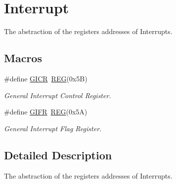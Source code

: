 \hypertarget{group__INTERRUPTMCAL}{\section{Interrupt}
\label{group__INTERRUPTMCAL}
}


The abstraction of the registers addresses of Interrupts.  


\subsection*{Macros}
\begin{DoxyCompactItemize}
\item 
\hypertarget{group__INTERRUPTMCAL_ga3e35f0f5ebfa96f116683e03fdd2d28e}{\#define \hyperlink{group__INTERRUPTMCAL_ga3e35f0f5ebfa96f116683e03fdd2d28e}{G\+I\+C\+R}~\hyperlink{group__MCAL_ga72e45020e46f285689db51c46f273403}{R\+E\+G}(0x5\+B)}\label{group__INTERRUPTMCAL_ga3e35f0f5ebfa96f116683e03fdd2d28e}

\begin{DoxyCompactList}\small\item\em General Interrupt Control Register. \end{DoxyCompactList}\item 
\hypertarget{group__INTERRUPTMCAL_gad9dd0adb0671ca21dcabb1d0cf0afff5}{\#define \hyperlink{group__INTERRUPTMCAL_gad9dd0adb0671ca21dcabb1d0cf0afff5}{G\+I\+F\+R}~\hyperlink{group__MCAL_ga72e45020e46f285689db51c46f273403}{R\+E\+G}(0x5\+A)}\label{group__INTERRUPTMCAL_gad9dd0adb0671ca21dcabb1d0cf0afff5}

\begin{DoxyCompactList}\small\item\em General Interrupt Flag Register. \end{DoxyCompactList}\end{DoxyCompactItemize}


\subsection{Detailed Description}
The abstraction of the registers addresses of Interrupts. 


